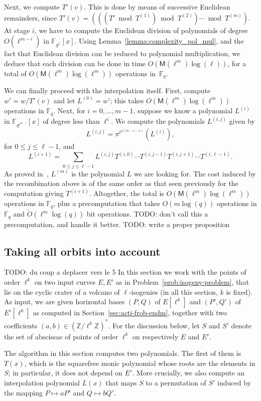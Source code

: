 \documentclass{lms}
\newcommand{\todo}[1]{{\color{red}TODO: #1}}
\newcommand{\F}{\mathbb{F}}
\begin{document}
Next, we compute $T'(v)$. This is done by means of successive
Euclidean remainders, since $T'(v) = (((T' \bmod T^{(1)}) \bmod
T^{(2)}) \cdots \bmod T^{(m)})$.  At stage $i$, we have to compute 
the Euclidean division of polynomials of degree $O(\ell^{m-i})$ 
in $\F_{q^{\ell^i}}[x]$. Using Lemma~\ref{lemma:complexity_pol_mul},
and the fact that Euclidean division can be reduced to polynomial 
multiplication, we deduce that each division can be done in time
$O(\mathsf{M}(\ell^m)\log(\ell))$, for a total of 
$O(\mathsf{M}(\ell^m)\log(\ell^m))$ operations in~$\F_q$.

We can finally proceed with the interpolation itself. First, compute
$w' = w/T'(v)$ and let $L^{(0)}=w'$; this takes $O(\mathsf{M}(\ell^m)\log(\ell^m))$ operations in $\F_q$.
Next, for $i=0,\dots,m-1$, suppose we
know a polynomial $L^{(i)}$ in $\F_{q^{\ell^{m-i}}}[x]$
 of degree less than
$\ell^i$. We compute the polynomials $L^{(i,j)}$ given by
$$L^{(i,j)}= \pi^{\ell^{j(m-i-1)}}\left (L^{(i)} \right),$$
for $0 \le j \le \ell-1$, 
and 
$$L^{(i+1)} = \sum_{0 \le j \le \ell-1} L^{(i,j)} T^{(i,0)} \cdots
T^{(i,j-1)} T^{(i,j+1)} \cdots T^{(i,\ell-1)}.$$ As proved
in~\cite{df10}, $L^{(m)}$ is the polynomial $L$ we are looking for.
The cost induced by the recombination above is of the same order as
that seen previously for the computation giving
$T^{(i+1)}$. Altogether, the total is $O(\mathsf{M}(\ell^m)
\log(\ell^m))$ operations in $\F_q$, plus a precomputation that takes
$O(m \log(q))$ operations in $\F_q$ and $\tilde{O}(\ell^{m} \log(q))$
bit operations. \todo{don't call this a precomputation, and handle it better.}
\todo{write a proper proposition}

\subsection{Taking all orbits into account}
\todo{du coup a deplacer vers le 5}
In this section we work with the points of order $\ell^k$ on two input
curves $E,E'$ as in Problem~\ref{prob:isogeny-problem}, that lie on
the cyclic crater of a volcano of $\ell$-isogenies (in all this
section, $k$ is fixed).
As input, we are given horizontal bases $(P,Q)$ of $E[\ell^k]$ and
$(P',Q')$ of $E'[\ell^k]$ as computed in
Section~\ref{sec:acti-frob-endm}, together with two coefficients $(a,b)
\in \left(\mathbb{Z}/\ell^k \mathbb{Z} \right)^*$. For the discussion below,
let $S$ and $S'$ denote the set of abscissae of points of order
$\ell^k$ on respectively $E$ and $E'$.

The algorithm in this section computes two polynomials. The first of
them is $T(x)$, which is the squarefree monic polynomial whose roots
are the elements in $S$; in particular, it does not depend on
$E'$. More crucially, we also compute an interpolation polynomial
$L(x)$ that maps $S$ to a permutation of $S'$ induced by the mapping
$P \mapsto aP'$ and $Q \mapsto bQ'$.
\end{document}
